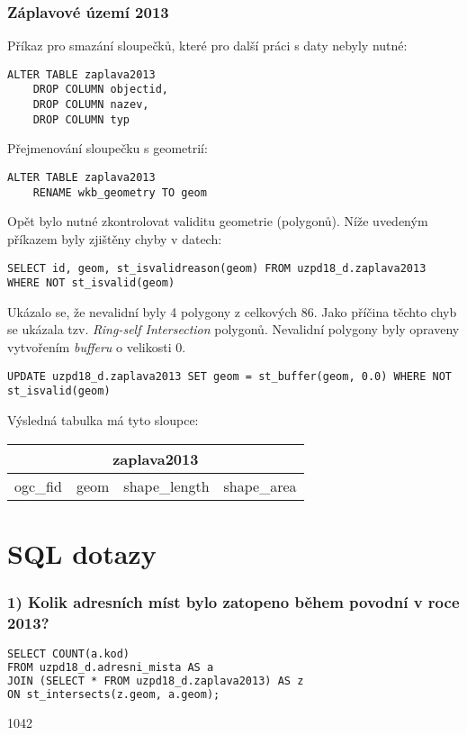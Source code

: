 \documentclass[a4paper, 12pt]{article}
\begin{document}
\subsubsection*{Záplavové území 2013}
Příkaz pro smazání sloupečků, které pro další práci s daty nebyly nutné:
\begin{lstlisting}
ALTER TABLE zaplava2013
    DROP COLUMN objectid,
    DROP COLUMN nazev,
    DROP COLUMN typ
\end{lstlisting}
Přejmenování sloupečku s geometrií:
\begin{lstlisting}
ALTER TABLE zaplava2013
    RENAME wkb_geometry TO geom
\end{lstlisting} 
Opět bylo nutné zkontrolovat validitu geometrie (polygonů). Níže uvedeným příkazem byly zjištěny chyby v datech:
\begin{lstlisting}
SELECT id, geom, st_isvalidreason(geom) FROM uzpd18_d.zaplava2013 WHERE NOT st_isvalid(geom)
\end{lstlisting}
Ukázalo se, že nevalidní byly 4 polygony z celkových 86. Jako příčina těchto chyb se ukázala tzv. \textit{Ring-self Intersection} polygonů. Nevalidní polygony byly opraveny vytvoře\-ním \textit{bufferu} o velikosti 0. 
\begin{lstlisting}
UPDATE uzpd18_d.zaplava2013 SET geom = st_buffer(geom, 0.0) WHERE NOT st_isvalid(geom)
\end{lstlisting}
Výsledná tabulka má tyto sloupce:

\begin{table}[h!]
\centering
\begin{tabular}{|c|c|c|c|}
\hline
\multicolumn{4}{|c|}{\textbf{zaplava2013}}    \\ \hline
ogc\_fid & geom & shape\_length & shape\_area \\ \hline
\end{tabular}
\end{table}
\clearpage

\section{SQL dotazy}
\subsubsection*{1) Kolik adresních míst bylo zatopeno během povodní v roce 2013?}
\begin{lstlisting}[language=html]
SELECT COUNT(a.kod) 
FROM uzpd18_d.adresni_mista AS a
JOIN (SELECT * FROM uzpd18_d.zaplava2013) AS z
ON st_intersects(z.geom, a.geom);
\end{lstlisting}
1042
\vspace{0.8cm}
\end{document}
